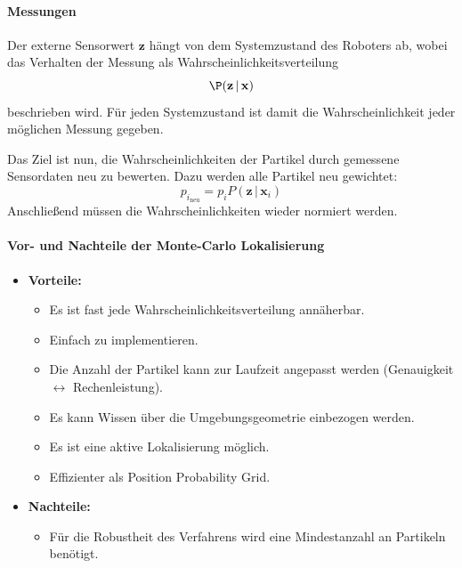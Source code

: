 \documentclass[a4paper, 11pt, accentcolor = tud3b]{tudreport}
\newcommand{\given}{\,\vert\,}
\renewcommand{\vec}[1]{\boldsymbol{\mathbf{#1}}}
\begin{document}
					\paragraph{Messungen}
						Der externe Sensorwert \( \vec{z} \) hängt von dem Systemzustand des Roboters ab, wobei das Verhalten der Messung als Wahrscheinlichkeitsverteilung
						\begin{equation*}
							\P(\vec{z} \given \vec{x})
						\end{equation*}
						beschrieben wird. Für jeden Systemzustand ist damit die Wahrscheinlichkeit jeder möglichen Messung gegeben.
						
						Das Ziel ist nun, die Wahrscheinlichkeiten der Partikel durch gemessene Sensordaten neu zu bewerten. Dazu werden alle Partikel neu gewichtet:
						\begin{equation*}
							p_{i_\text{neu}} = p_i P(\vec{z} \given \vec{x}_i)
						\end{equation*}
						Anschließend müssen die Wahrscheinlichkeiten wieder normiert werden.
					
					\paragraph{Vor- und Nachteile der Monte-Carlo Lokalisierung}
						\begin{itemize}
							\item \textbf{Vorteile:}
								\begin{itemize}
									\item Es ist fast jede Wahrscheinlichkeitsverteilung annäherbar.
									\item Einfach zu implementieren.
									\item Die Anzahl der Partikel kann zur Laufzeit angepasst werden (Genauigkeit \(\leftrightarrow\) Rechenleistung).
									\item Es kann Wissen über die Umgebungsgeometrie einbezogen werden.
									\item Es ist eine aktive Lokalisierung möglich.
									\item Effizienter als Position Probability Grid.
								\end{itemize}
							\item \textbf{Nachteile:}
								\begin{itemize}
									\item Für die Robustheit des Verfahrens wird eine Mindestanzahl an Partikeln benötigt.
								\end{itemize}
						\end{itemize}
\end{document}
